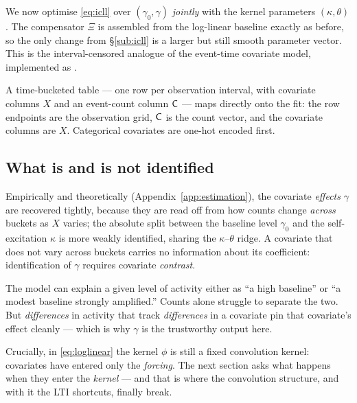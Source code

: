 We now optimise \eqref{eq:icll} over $(\gamma_0,\gamma)$ \emph{jointly} with the
kernel parameters $(\kappa,\theta)$. The compensator $\Xi$ is assembled from the
log-linear baseline exactly as before, so the only change from
\S\ref{sub:icll} is a larger but still smooth parameter vector. This is the
interval-censored analogue of the event-time covariate model, implemented as
.

\begin{remark}
A time-bucketed table --- one row per observation interval, with covariate columns
$X$ and an event-count column $\mathsf{C}$ --- maps directly onto the fit: the row
endpoints are the observation grid, $\mathsf{C}$ is the count vector, and the
covariate columns are $X$. Categorical covariates are one-hot encoded first.
\end{remark}

\subsection{What is and is not identified}

Empirically and theoretically (Appendix~\ref{app:estimation}), the covariate
\emph{effects} $\gamma$ are recovered tightly, because they are read off from how
counts change \emph{across} buckets as $X$ varies; the absolute split between the
baseline level $\gamma_0$ and the self-excitation $\kappa$ is more weakly
identified, sharing the $\kappa$--$\theta$ ridge. A covariate that does not vary
across buckets carries no information about its coefficient: identification of
$\gamma$ requires covariate \emph{contrast}.

\begin{intuition}
The model can explain a given level of activity either as ``a high baseline'' or
``a modest baseline strongly amplified.'' Counts alone struggle to separate the
two. But \emph{differences} in activity that track \emph{differences} in a
covariate pin that covariate's effect cleanly --- which is why $\gamma$ is the
trustworthy output here.
\end{intuition}

\medskip
\noindent
Crucially, in \eqref{eq:loglinear} the kernel $\phi$ is still a fixed convolution
kernel: covariates have entered only the \emph{forcing}. The next section asks what
happens when they enter the \emph{kernel} --- and that is where the convolution
structure, and with it the LTI shortcuts, finally break.
